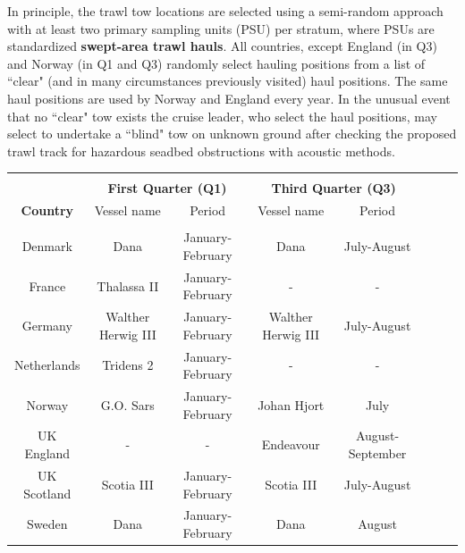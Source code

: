 \documentclass[a4paper 12pt]{article}
\numberwithin{equation}{section}
\begin{document}
\indent In principle, the trawl tow locations are selected using a  semi-random approach with at least two primary sampling units (PSU) per stratum, where PSUs are standardized {\bf swept-area trawl hauls}. All countries, except England (in Q3) and Norway (in Q1 and Q3) randomly select hauling positions from a list of ``clear" (and in many circumstances previously visited) haul positions. The same haul positions are used by Norway and England every year. In the unusual event that no ``clear" tow exists the cruise leader, who select the haul positions, may select to undertake a ``blind" tow on unknown ground after checking the proposed trawl track for hazardous seadbed obstructions with acoustic methods. \\

\begin{table}[h!]
\centering
{}
\begin{tabular}{cccccccc}
\hline \\[0.1ex]
  & \multicolumn{2}{c}{\bf First Quarter (Q1)} & \multicolumn{2}{c}{\bf Third Quarter (Q3)}\\[1.5ex]
{\bf Country }  & Vessel name & Period    & Vessel name & Period  \\[0.5ex]
\hline \\[0.5ex]
Denmark  &   Dana   &   January-February  & Dana & July-August    \\[1ex]
France  & Thalassa II & January-February & - & -   \\[1ex]
Germany   &  Walther  Herwig III & January-February   &   Walther  Herwig III & July-August \\[1ex]
Netherlands &  Tridens 2 &  January-February   & - & -     \\[1ex]
Norway  &   G.O. Sars  & January-February &    Johan Hjort  & July   \\[1ex]
UK England &- & -&  Endeavour &  August-September  \\[1ex]
UK Scotland   &  Scotia III &  January-February & Scotia III &  July-August \\[1ex]
Sweden  &  Dana &  January-February  &  Dana &  August                  \\[0.5ex]
\hline
\end{tabular}
\end{table}
\end{document}
